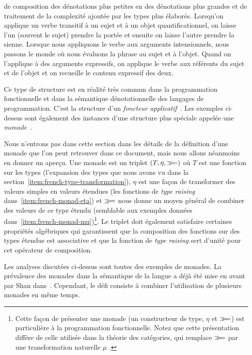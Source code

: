 \begin{enumerate}
  de composition des dénotations plus petites en des dénotations plus grandes
  et de traitement de la complexité ajoutée par les types plus élaborés. Lorsqu'on
  applique un verbe transitif à un sujet et à un objet quantificationnel, on
  laisse l'un (souvent le sujet) prendre la portée et ensuite on laisse l'autre
  prendre la sienne. Lorsque nous appliquons le verbe aux arguments
  intensionnels, nous passons le monde où nous évaluons la phrase au sujet et
  à l'objet. Quand on l'applique à des arguments expressifs, on applique le verbe
  aux référents du sujet et de l'objet et on recueille le contenu expressif des deux.
\end{enumerate}

Ce type de structure est en réalité très commun dans la programmation fonctionnelle et dans
la sémantique dénotationnelle des langages de programmation. C'est la structure
d'un \emph{foncteur applicatif}~\cite{mcbride2008applicative}. Les exemples
ci-dessus sont également des instances d'une structure plus spéciale appelée une
\emph{monade}~\cite{moggi1991notions}.

Nous n'entrons pas dans cette section dans les détails de la définition d'une monade que l'on peut retrouver dans ce document,
mais nous allons néanmoins en donner un aperçu. Une monade est un triplet $(T, \eta,
\mathbin{\gg\!=})$ où $T$ est une fonction sur les types (l'expansion des types que nous
avons vu dans la section~\ref{item:french-type-transformation}), $\eta$ est une façon de
transformer des valeurs simples en valeurs étendues (les fonctions de \textit{type raising}
dans~\ref{item:french-monad-eta}) et $\mathbin{\gg\!=}$ nous donne un moyen général de
combiner des valeurs de ce type étendu (semblable aux exemples données
dans~\ref{item:french-monad-mu})\footnote{Cette façon de présenter une monade (un
  constructeur de type, $\eta$ et $\mathbin{\gg\!=}$) est particulière à la programmation
  fonctionnelle. Notez que cette présentation diffère de celle utilisée dans la
  théorie des catégories, qui remplace $\mathbin{\gg\!=}$ par une transformation
  naturelle $\mu$ \cite{mac1978categories}.}. Le triplet doit également satisfaire
certaines propriétés algébriques qui garantissent que la composition des
fonctions sur des types étendus est associative et que la fonction de \emph{type raising}
sert d'unité pour cet opérateur de composition.

Les analyses discutées ci-dessus sont toutes des exemples de monades. La
prévalence des monades dans la sémantique de la langue a déjà été
mise en avant par Shan dans~\cite{shan2002monads}. Cependant, le défi consiste à
combiner l'utilisation de plusieurs monades en même temps.


